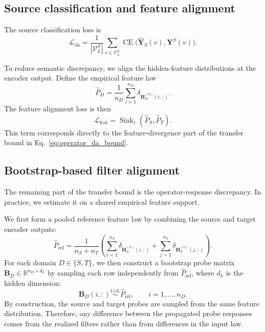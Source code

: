 \documentclass[runningheads]{llncs}
\def\sV{{\mathcal{V}}}
\def\sL{{\mathcal{L}}}
\def\real{{\mathbb{R}}}
\def\mB{{\mathbf{B}}}
\def\mH{{\mathbf{H}}}
\def\mY{{\mathbf{Y}}}
\DeclareMathOperator{\Sink}{Sink}
\DeclareMathOperator{\CE}{CE}
\begin{document}
\subsection{Source classification and feature alignment}

The source classification loss is
\begin{equation}
\sL_{\mathrm{cls}}
=
\frac{1}{|\sV_L^S|}
\sum_{v\in \sV_L^S}
\CE\big(\hat{\mY}_S(v),\mY^S(v)\big).
\label{eq:supervised_loss}
\end{equation}

To reduce semantic discrepancy, we align the hidden-feature distributions at the encoder output. Define the empirical feature law
\begin{equation}
\widehat P_D
=
\frac{1}{n_D}\sum_{i=1}^{n_D}\delta_{\mH_D^{(0)}(i,:)}.
\label{eq:feature_law}
\end{equation}
The feature alignment loss is then
\begin{equation}
\sL_{\mathrm{feat}}
=
\Sink_\varepsilon(\widehat P_S,\widehat P_T).
\label{eq:feature_loss}
\end{equation}
This term corresponds directly to the feature-divergence part of the transfer bound in Eq.~\eqref{eq:operator_da_bound}.

\subsection{Bootstrap-based filter alignment}

The remaining part of the transfer bound is the operator-response discrepancy. In practice, we estimate it on a shared empirical feature support.

We first form a pooled reference feature law by combining the source and target encoder outputs:
\begin{equation}
\widehat P_{\mathrm{ref}}
=
\frac{1}{n_S+n_T}
\left(
\sum_{i=1}^{n_S}\delta_{\mH_S^{(0)}(i,:)}
+
\sum_{j=1}^{n_T}\delta_{\mH_T^{(0)}(j,:)}
\right).
\label{eq:ref_feature_dist}
\end{equation}
For each domain $D\in\{S,T\}$, we then construct a bootstrap probe matrix $\mB_D\in\real^{n_D\times d_h}$ by sampling each row independently from $\widehat P_{\mathrm{ref}}$, where $d_h$ is the hidden dimension:
\begin{equation}
\mB_D(i,:) \stackrel{\mathrm{i.i.d.}}{\sim} \widehat P_{\mathrm{ref}},
\qquad i=1,\dots,n_D.
\label{eq:bootstrap_probes}
\end{equation}
By construction, the source and target probes are sampled from the same feature distribution. Therefore, any difference between the propagated probe responses comes from the realized filters rather than from differences in the input law.
\end{document}
